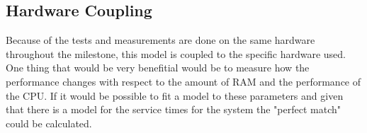 \documentclass[a4paper, 11pt]{article}
\begin{document}
	\subsection{Hardware Coupling}
		Because of the tests and measurements are done on the same hardware throughout the milestone, this model is coupled to the specific hardware used. One thing that would be very benefitial would be to measure how the performance changes with respect to the amount of RAM and the performance of the CPU. If it would be possible to fit a model to these parameters and given that there is a model for the service times for the system the "perfect match" could be calculated.
\end{document}
